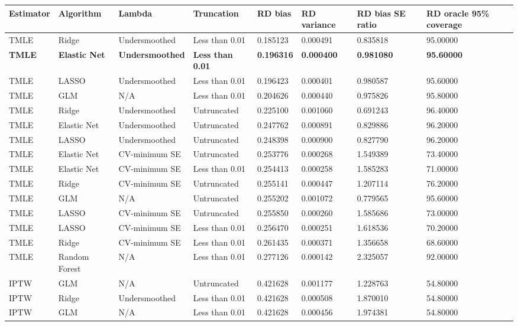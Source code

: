 
\begin{longtable}[l]{llllllll}
\toprule
Estimator & Algorithm & Lambda & Truncation & RD bias & RD variance & RD bias SE ratio & RD oracle 95\% coverage\\
\midrule
TMLE & Ridge & Undersmoothed & Less than 0.01 & 0.185123 & 0.000491 & 0.835818 & 95.00000\\
\midrule
\textbf{TMLE} & \textbf{Elastic Net} & \textbf{Undersmoothed} & \textbf{Less than 0.01} & \textbf{0.196316} & \textbf{0.000400} & \textbf{0.981080} & \textbf{95.60000}\\
\midrule
TMLE & LASSO & Undersmoothed & Less than 0.01 & 0.196423 & 0.000401 & 0.980587 & 95.60000\\
TMLE & GLM & N/A & Less than 0.01 & 0.204626 & 0.000440 & 0.975826 & 95.80000\\
TMLE & Ridge & Undersmoothed & Untruncated & 0.225100 & 0.001060 & 0.691243 & 96.40000\\
TMLE & Elastic Net & Undersmoothed & Untruncated & 0.247762 & 0.000891 & 0.829886 & 96.20000\\
TMLE & LASSO & Undersmoothed & Untruncated & 0.248398 & 0.000900 & 0.827790 & 96.20000\\
TMLE & Elastic Net & CV-minimum SE & Untruncated & 0.253776 & 0.000268 & 1.549389 & 73.40000\\
TMLE & Elastic Net & CV-minimum SE & Less than 0.01 & 0.254413 & 0.000258 & 1.585283 & 71.00000\\
TMLE & Ridge & CV-minimum SE & Untruncated & 0.255141 & 0.000447 & 1.207114 & 76.20000\\
TMLE & GLM & N/A & Untruncated & 0.255202 & 0.001072 & 0.779565 & 95.60000\\
TMLE & LASSO & CV-minimum SE & Untruncated & 0.255850 & 0.000260 & 1.585686 & 73.00000\\
TMLE & LASSO & CV-minimum SE & Less than 0.01 & 0.256470 & 0.000251 & 1.618536 & 70.20000\\
TMLE & Ridge & CV-minimum SE & Less than 0.01 & 0.261435 & 0.000371 & 1.356658 & 68.60000\\
TMLE & Random Forest & N/A & Less than 0.01 & 0.277126 & 0.000142 & 2.325057 & 92.00000\\
IPTW & GLM & N/A & Untruncated & 0.421628 & 0.001177 & 1.228763 & 54.80000\\
IPTW & Ridge & Undersmoothed & Less than 0.01 & 0.421628 & 0.000508 & 1.870010 & 54.80000\\
IPTW & GLM & N/A & Less than 0.01 & 0.421628 & 0.000456 & 1.974381 & 54.80000\\

\end{longtable}
